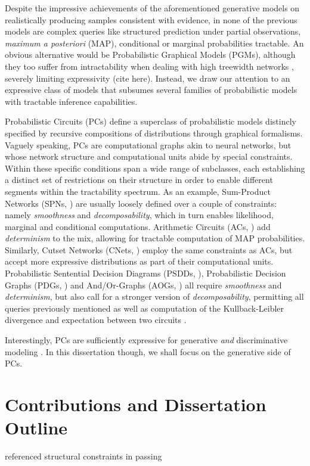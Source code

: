 Despite the impressive achievements of the aforementioned generative models on realistically
producing samples consistent with evidence, in none of the previous models are complex queries like
structured prediction under partial observations, \emph{maximum a posteriori} (MAP), conditional or
marginal probabilities tractable. An obvious alternative would be Probabilistic Graphical Models
(PGMs), although they too suffer from intractability when dealing with high treewidth networks
\citep{dechter98,koller09}, severely limiting expressivity (cite here). Instead, we draw our
attention to an expressive class of models that subsumes several families of probabilistic models
with tractable inference capabilities.

Probabilistic Circuits (PCs) define a superclass of probabilistic models distincly specified by
recursive compositions of distributions through graphical formalisms. Vaguely speaking, PCs are
computational graphs akin to neural networks, but whose network structure and computational units
abide by special constraints. Within these specific conditions span a wide range of subclasses,
each establishing a distinct set of restrictions on their structure in order to enable different
segments within the tractability spectrum. As an example, Sum-Product Networks (SPNs,
\cite{poon11}) are usually loosely defined over a couple of constraints: namely \emph{smoothness}
and \emph{decomposability}, which in turn enables likelihood, marginal and conditional
computations. Arithmetic Circuits (ACs, \cite{darwiche03}) add \emph{determinism} to the mix,
allowing for tractable computation of MAP probabilities. Similarly, Cutset Networks (CNets,
\cite{rahman14}) employ the same constraints as ACs, but accept more expressive distributions as
part of their computational units. Probabilistic Sentential Decision Diagrams (PSDDs,
\cite{kisa14}), Probabilistic Decision Graphs (PDGs, \cite{jaeger04}) and And/Or-Graphs (AOGs,
\cite{dechter07}) all require \emph{smoothness} and \emph{determinism}, but also call for a
stronger version of \emph{decomposability}, permitting all queries previously mentioned as well as
computation of the Kullback-Leibler divergence and expectation between two circuits \citep{choi20}.

Interestingly, PCs are sufficiently expressive for generative \emph{and} discriminative modeling
\citep{khosravi19,rashwan18a,rooshenas16,gens12,shao20}. In this dissertation though, we shall
focus on the generative side of PCs.

\section{Contributions and Dissertation Outline}

referenced structural constraints in passing
